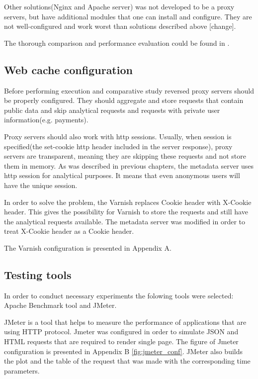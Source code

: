 Other solutions(Nginx and Apache server) was not developed to be a proxy servers, but have additional modules that one can install and configure. They are not well-configured and work worst than solutions described above \cite{GuApacheTrafficUri}[change].

The thorough comparison and performance evaluation could be found in \cite{VarnApacheReverse}.    


\subsection{Web cache configuration}

Before performing execution and comparative study reversed proxy servers should be properly configured. They should aggregate and store requests that contain public data and skip analytical requests and requests with private user information(e.g. payments).

Proxy servers should also work with http sessions. Usually, when session is specified(the set-cookie http header included in the server response), proxy servers are transparent, meaning they are skipping these requests and not store them in memory. As was described in previous chapters, the metadata server uses http session for analytical purposes. It means that even anonymous users will have the unique session. 

In order to solve the problem, the Varnish replaces Cookie header with X-Cookie header. This gives the possibility for Varnish to store the requests and still have the analytical requests available. The metadata server was modified in order to treat X-Cookie header as a Cookie header.   

The Varnish configuration is presented in Appendix A.

\subsection{Testing tools}

In order to conduct necessary experiments the folowing tools were selected: Apache Benchmark tool and JMeter.


JMeter is a tool that helps to measure the performance of applications that are using HTTP protocol. Jmeter was configured in order to simulate JSON and HTML requests that are required to render single page. The figure of Jmeter configuration is presented in Appendix B \ref{fig:jmeter_conf}. 
JMeter also builds the plot and the table of the request that was made with the corresponding time parameters.  


